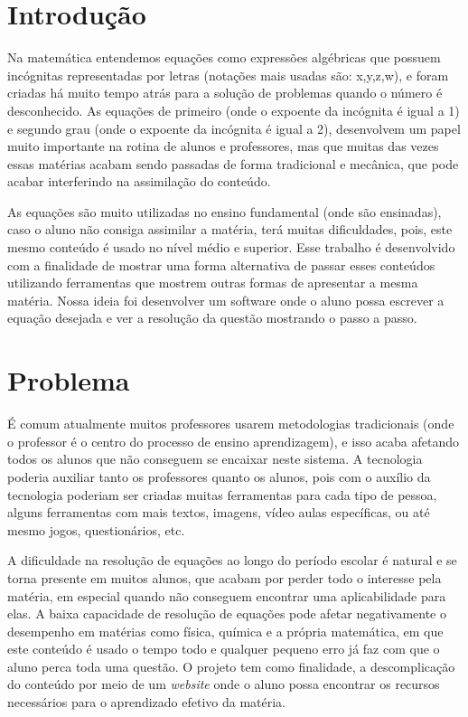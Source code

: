 \documentclass[12pt]{report}
\begin{document}
\tableofcontents
\newpage

\chapter{Introdução}
Na matemática entendemos equações como expressões algébricas que possuem incógnitas representadas por letras (notações mais usadas são: x,y,z,w), e foram criadas há muito tempo atrás para a solução de problemas quando o número é desconhecido. As equações de primeiro (onde o expoente da incógnita é igual a 1) e segundo grau  (onde o expoente da incógnita é igual a 2), desenvolvem um papel muito importante na rotina de alunos e professores, mas que muitas das vezes essas matérias acabam sendo passadas de forma tradicional e mecânica, que pode acabar interferindo na assimilação do conteúdo.

As equações são muito utilizadas no ensino fundamental (onde são ensinadas), caso o aluno não consiga assimilar a matéria, terá muitas dificuldades, pois, este mesmo conteúdo é usado no nível médio e superior. Esse trabalho é desenvolvido com a finalidade de mostrar uma forma alternativa de passar esses conteúdos utilizando ferramentas que mostrem outras formas de apresentar a mesma matéria. Nossa ideia foi desenvolver um software onde o aluno possa escrever a equação desejada e ver a resolução da questão mostrando o passo a passo. 

\chapter{Problema}
É comum atualmente muitos professores usarem metodologias tradicionais (onde o professor é o centro do processo de ensino aprendizagem), e isso acaba afetando todos os alunos que não conseguem se encaixar neste sistema. A tecnologia poderia auxiliar tanto os professores quanto os alunos, pois com o auxílio da tecnologia poderiam ser criadas muitas ferramentas para cada tipo de pessoa, alguns ferramentas com mais textos, imagens, vídeo aulas específicas, ou até mesmo jogos, questionários, etc.

A dificuldade na resolução de equações ao longo do período escolar é natural e se torna presente em muitos alunos, que acabam por perder todo o interesse pela matéria, em especial quando não conseguem encontrar uma aplicabilidade para elas. A baixa capacidade de resolução de equações pode afetar negativamente o desempenho em matérias como física, química e a própria matemática, em que este conteúdo é usado o tempo todo e qualquer pequeno erro já faz com que o aluno perca toda uma questão. O projeto tem como finalidade, a descomplicação do conteúdo por meio de um \textit{website} onde o aluno possa encontrar os recursos necessários para o aprendizado efetivo da matéria.
\end{document}
